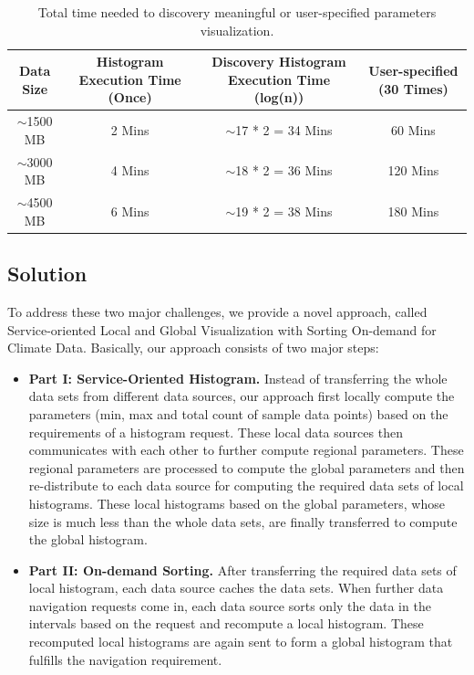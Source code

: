 \documentclass[times, 10pt,onecolumn]{article} %
\begin{document}
\begin{table}[!iht]
\centering
\begin{tabular}{|c|c|c|c|}
\hline
\textbf{Data Size} & \textbf{Histogram Execution Time (Once) } & \textbf{Discovery Histogram Execution Time (log(n))} & \textbf{User-specified (30 Times)} \\ \hline
$\sim$1500 MB & 2 Mins & $\sim$17 * 2 = 34 Mins & 60 Mins \\ \hline
$\sim$3000 MB & 4 Mins &  $\sim$18 * 2 = 36 Mins & 120 Mins \\ \hline 
$\sim$4500 MB & 6 Mins &  $\sim$19 * 2 = 38 Mins & 180 Mins \\ \hline 
\end{tabular}
\caption{Total time needed to discovery meaningful or user-specified parameters visualization.}
\label{tbl:time}
\end{table}

\subsection{Solution}
To address these two major challenges, we provide a novel approach, called Service-oriented Local and Global Visualization with Sorting On-demand for Climate Data. Basically, our approach consists of two major steps: 

\begin{itemize}
\item{\textbf{Part I: Service-Oriented Histogram.}} Instead of transferring the whole data sets from different data sources, our approach first locally compute the parameters (min, max and total count of sample data points) based on the requirements of a histogram request. These local data sources then communicates with each other to further compute regional parameters. These regional parameters are processed to compute the global parameters and then re-distribute to each data source for computing the required data sets of local histograms. These local histograms based on the global parameters, whose size is much less than the whole data sets, are finally transferred to compute the global histogram.
\item{\textbf{Part II: On-demand Sorting.}} After transferring the required data sets of local histogram, each data source caches the data sets. When further data navigation requests come in, each data source sorts only the data in the intervals based on the request and recompute a local histogram. These recomputed local histograms are again sent to form a global histogram that fulfills the navigation requirement. 
\end{itemize}
\end{document}
